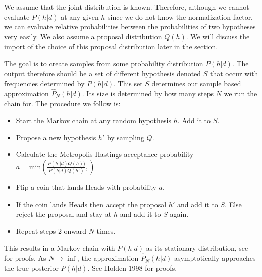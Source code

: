We assume that the joint distribution is known. Therefore, although we cannot evaluate $P(h | d)$ at any given $h$ since we do not know the normalization factor, we can evaluate relative probabilities between the probabilities of two hypotheses very easily. We also assume a proposal distribution $Q(h)$. We will discuss the import of the choice of this proposal distribution later in the section. 

The goal is to create samples from some probability distribution $P(h | d)$. The output therefore should be a set of different hypothesis denoted $S$ that occur with frequencies determined by $P(h | d)$. This set $S$ determines our sample based approximation $\hat{P}_N(h|d) $. Its size is determined by how many steps $N$ we run the chain for. The procedure we follow is:
\begin{itemize}
\item Start the Markov chain at any random hypothesis $h$. Add it to $S$.
\item Propose a new hypothesis $h'$ by sampling $Q$.
\item Calculate the Metropolis-Hastings acceptance probability $a = \text{min}\left( \frac{P(h' | d) Q(h))}{P(h | d) Q(h')}, \right)$
\item Flip a coin that lands Heads with probability $a$.
\item If the coin lands Heads then accept the proposal $h'$ and add it to $S$. Else reject the proposal and stay at $h$ and add it to $S$ again.
\item Repeat steps 2 onward $N$ times.
\end{itemize}

This results in a Markov chain with $P(h|d)$ as its stationary distribution, see \citet{blitzstein2014introduction} for proofs. As  $N \rightarrow \inf$, the approximation $\hat{P}_N(h|d) $ asymptotically approaches the true posterior $P(h | d)$. See Holden 1998 \cite{holden1998geometric} for proofs.

